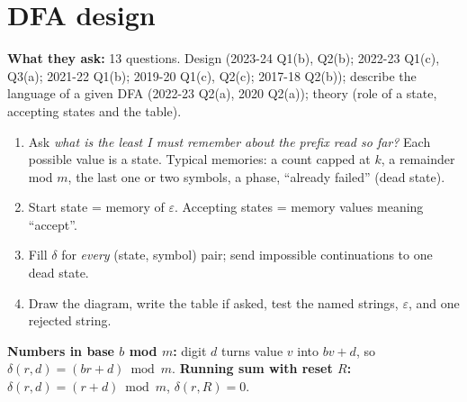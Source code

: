 \documentclass[10.5pt,a4paper]{article}
\newcommand{\asked}[1]{{\small\color{gray!60!black}\textbf{What they ask:} #1}\par}
\newcommand{\eps}{\varepsilon}
\begin{document}
\section{DFA design}
\asked{13 questions. Design (2023-24 Q1(b), Q2(b); 2022-23 Q1(c), Q3(a); 2021-22 Q1(b); 2019-20 Q1(c), Q2(c); 2017-18 Q2(b)); describe the
language of a given DFA (2022-23 Q2(a), 2020 Q2(a)); theory (role of a state, accepting states and the table).}
\begin{recipe}
\begin{enumerate}
\item Ask \emph{what is the least I must remember about the prefix read so far?} Each possible value is a state. Typical memories: a count
capped at $k$, a remainder mod $m$, the last one or two symbols, a phase, ``already failed'' (dead state).
\item Start state = memory of $\eps$. Accepting states = memory values meaning ``accept''.
\item Fill $\delta$ for \emph{every} (state, symbol) pair; send impossible continuations to one dead state.
\item Draw the diagram, write the table if asked, test the named strings, $\eps$, and one rejected string.
\end{enumerate}
\textbf{Numbers in base $b$ mod $m$:} digit $d$ turns value $v$ into $bv+d$, so $\delta(r,d)=(br+d)\bmod m$.
\textbf{Running sum with reset $R$:} $\delta(r,d)=(r+d)\bmod m$, $\delta(r,R)=0$.
\end{recipe}
\end{document}
